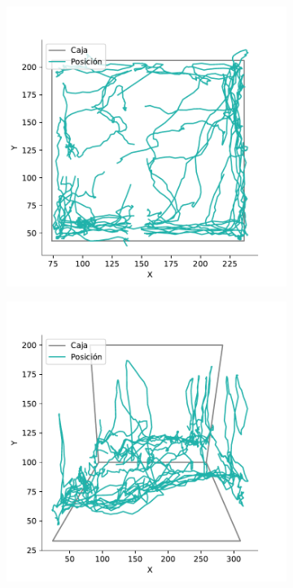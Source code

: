 \begin{figure}[H]
\begin{subfigure}{0.45\textwidth}
    \caption{}
    \label{fig:raw-top}
  \end{subfigure}
  \begin{subfigure}{0.45\textwidth}
    \centering
    \includegraphics[width=\textwidth]{figures/filtered-trayectory-top-4128-2020-12-02.pdf}
    \caption{}
  \end{subfigure}
  \begin{subfigure}{0.45\textwidth}
    \centering
    \includegraphics[width=\textwidth]{figures/filtered-trayectory-lateral-4128-2020-12-02.pdf}

\end{subfigure}
\end{figure}
